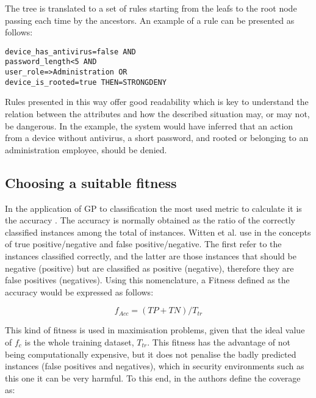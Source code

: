 \documentclass[a4paper,10pt,twocolumn,preprint,3p]{elsarticle}
\begin{document}
The tree is translated to a set of rules starting from the leafs to the root node passing each time by the ancestors. An example of a rule can be presented as follows:

\begin{verbatim}
device_has_antivirus=false AND
password_length<5 AND
user_role=>Administration OR
device_is_rooted=true THEN=STRONGDENY
\end{verbatim}

Rules presented in this way offer good readability which is key to understand the relation between the attributes and how the described situation may, or may not, be dangerous. In the example, the system would have inferred that an action from a device without antivirus, a short password, and rooted or belonging to an administration employee, should be denied.

\subsection{Choosing a suitable fitness}

In the application of GP to classification
the most used metric to calculate it is the accuracy
\cite{espejo2010survey}. The accuracy is normally obtained as the
ratio of the correctly classified instances among the total of
instances. Witten et al. use in \cite{witten2005data} the
concepts of true positive/negative and false positive/negative. The
first refer to the instances classified correctly, and the latter are
those instances that should be negative (positive) but are classified
as positive (negative), therefore they are false positives
(negatives). Using this nomenclature, a Fitness defined as the
accuracy would be expressed as follows: 

\begin{equation}
\label{eq:accuracy}
f_{Acc} = (TP + TN) / T_{tr}
\end{equation}

This kind of fitness is used in maximisation problems, given that the ideal value of $f_{c}$ is the whole training dataset, $T_{tr}$. This fitness has the advantage of not being computationally expensive, but it does not penalise the badly predicted instances (false positives and negatives), which in security environments such as this one it can be very harmful. To this end, in \cite{witten2005data} the authors define the coverage as:
\end{document}
